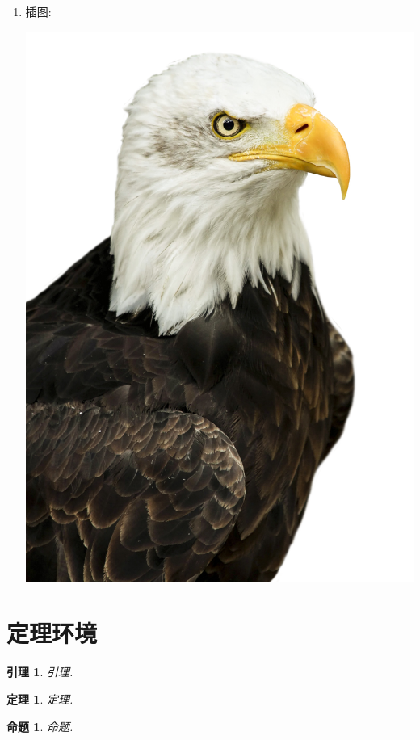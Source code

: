 \documentclass[a4paper, 11pt, UTF8]{article}
\theoremstyle{plain}
\newtheorem{thm}{定理}[section]
\newtheorem{lem}{引理}[section]
\newtheorem{prop}{命题}[section]
\theoremstyle{definition}
\theoremstyle{remark}
\begin{document}
\begin{enumerate}
		\item 插图:
			\begin{center}
			 	\includegraphics[scale=0.1]{1.png}	
			\end{center}	
	\end{enumerate}

	\section{定理环境}
	
	\begin{lem}
		引理.
	\end{lem}

	\begin{thm}
		定理.
	\end{thm}

	\begin{prop}
		命题.
	\end{prop}
\end{document}
